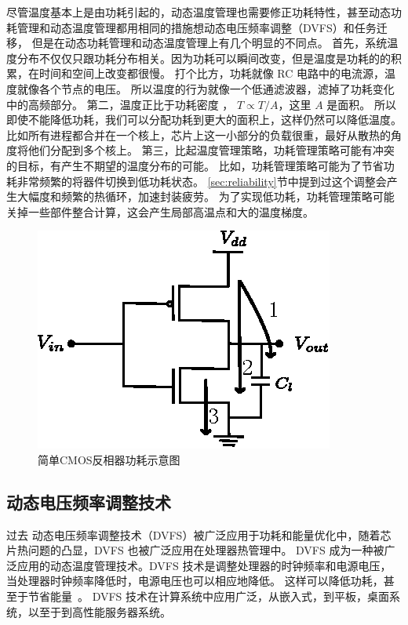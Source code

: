 尽管温度基本上是由功耗引起的，动态温度管理也需要修正功耗特性，甚至动态功耗管理和动态温度管理都用相同的措施想动态电压频率调整（DVFS）和任务迁移，
但是在动态功耗管理和动态温度管理上有几个明显的不同点。
首先，系统温度分布不仅仅只跟功耗分布相关。因为功耗可以瞬间改变，但是温度是功耗的的积累，在时间和空间上改变都很慢。
打个比方，功耗就像 RC 电路中的电流源，温度就像各个节点的电压。
所以温度的行为就像一个低通滤波器，滤掉了功耗变化中的高频部分。
第二，温度正比于功耗密度 ， $ T \propto T/A$，这里 $A$ 是面积。
所以即使不能降低功耗，我们可以分配功耗到更大的面积上，这样仍然可以降低温度。
比如所有进程都合并在一个核上，芯片上这一小部分的负载很重，最好从散热的角度将他们分配到多个核上。
第三，比起温度管理策略，功耗管理策略可能有冲突的目标，有产生不期望的温度分布的可能。
比如，功耗管理策略可能为了节省功耗非常频繁的将器件切换到低功耗状态。
\ref{sec:reliability}节中提到过这个调整会产生大幅度和频繁的热循环，加速封装疲劳。
为了实现低功耗，功耗管理策略可能关掉一些部件整合计算，这会产生局部高温点和大的温度梯度。
\\
\begin{figure}
  \centering
    \includegraphics[width=0.7\columnwidth]{fig/inverter}
  \caption{简单CMOS反相器功耗示意图}\label{fig:inverter}
\end{figure}

\subsection{动态电压频率调整技术}\label{sec:DVFS}

过去 动态电压频率调整技术（DVFS）被广泛应用于功耗和能量优化中，随着芯片热问题的凸显，DVFS 也被广泛应用在处理器热管理中。
DVFS 成为一种被广泛应用的动态温度管理技术。DVFS 技术是调整处理器的时钟频率和电源电压，当处理器时钟频率降低时，电源电压也可以相应地降低。
这样可以降低功耗，甚至于节省能量~\cite{le2010dynamic}。
DVFS 技术在计算系统中应用广泛，从嵌入式，到平板，桌面系统，以至于到高性能服务器系统。

